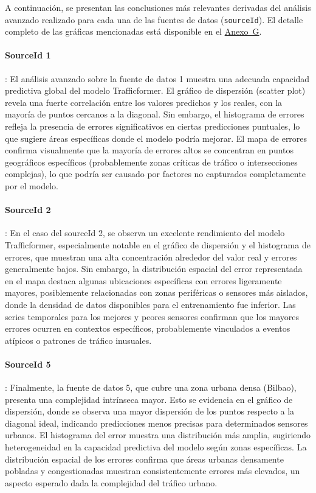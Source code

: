 A continuación, se presentan las conclusiones más relevantes derivadas del análisis avanzado realizado para cada una de las fuentes de datos (\texttt{sourceId}). El detalle completo de las gráficas mencionadas está disponible en el \hyperref[anexo:analisis_avanzado]{Anexo~G}.

\paragraph{SourceId 1}:
El análisis avanzado sobre la fuente de datos 1 muestra una adecuada capacidad predictiva global del modelo Trafficformer. El gráfico de dispersión (scatter plot) revela una fuerte correlación entre los valores predichos y los reales, con la mayoría de puntos cercanos a la diagonal. Sin embargo, el histograma de errores refleja la presencia de errores significativos en ciertas predicciones puntuales, lo que sugiere áreas específicas donde el modelo podría mejorar. El mapa de errores confirma visualmente que la mayoría de errores altos se concentran en puntos geográficos específicos (probablemente zonas críticas de tráfico o intersecciones complejas), lo que podría ser causado por factores no capturados completamente por el modelo.

\paragraph{SourceId 2}:
En el caso del sourceId 2, se observa un excelente rendimiento del modelo Trafficformer, especialmente notable en el gráfico de dispersión y el histograma de errores, que muestran una alta concentración alrededor del valor real y errores generalmente bajos. Sin embargo, la distribución espacial del error representada en el mapa destaca algunas ubicaciones específicas con errores ligeramente mayores, posiblemente relacionadas con zonas periféricas o sensores más aislados, donde la densidad de datos disponibles para el entrenamiento fue inferior. Las series temporales para los mejores y peores sensores confirman que los mayores errores ocurren en contextos específicos, probablemente vinculados a eventos atípicos o patrones de tráfico inusuales.

\paragraph{SourceId 5}:
Finalmente, la fuente de datos 5, que cubre una zona urbana densa (Bilbao), presenta una complejidad intrínseca mayor. Esto se evidencia en el gráfico de dispersión, donde se observa una mayor dispersión de los puntos respecto a la diagonal ideal, indicando predicciones menos precisas para determinados sensores urbanos. El histograma del error muestra una distribución más amplia, sugiriendo heterogeneidad en la capacidad predictiva del modelo según zonas específicas. La distribución espacial de los errores confirma que áreas urbanas densamente pobladas y congestionadas muestran consistentemente errores más elevados, un aspecto esperado dada la complejidad del tráfico urbano.

